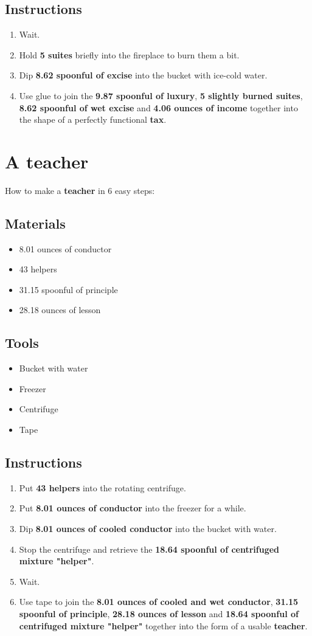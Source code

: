 \documentclass{article}
\begin{document}
\subsection{Instructions}\begin{enumerate}
\item 
Wait.
\item 
Hold \textbf{5 suites} briefly into the fireplace to burn them a bit.
\item 
Dip \textbf{8.62 spoonful of excise} into the bucket with ice-cold water.
\item 
Use glue to join the \textbf{9.87 spoonful of luxury}, \textbf{5 slightly burned suites}, \textbf{8.62 spoonful of wet excise} and \textbf{4.06 ounces of income} together into the shape of a perfectly functional \textbf{tax}.
\end{enumerate}
\newpage
\section{A teacher}How to make a \textbf{teacher} in 6 easy steps:

\subsection{Materials}\begin{itemize}
\item 
8.01 ounces of conductor
\item 
43 helpers
\item 
31.15 spoonful of principle
\item 
28.18 ounces of lesson
\end{itemize}
\subsection{Tools}\begin{itemize}
\item 
Bucket with water
\item 
Freezer
\item 
Centrifuge
\item 
Tape
\end{itemize}
\subsection{Instructions}\begin{enumerate}
\item 
Put \textbf{43 helpers} into the rotating centrifuge.
\item 
Put \textbf{8.01 ounces of conductor} into the freezer for a while.
\item 
Dip \textbf{8.01 ounces of cooled conductor} into the bucket with water.
\item 
Stop the centrifuge and retrieve the \textbf{18.64 spoonful of centrifuged mixture "helper"}.
\item 
Wait.
\item 
Use tape to join the \textbf{8.01 ounces of cooled and wet conductor}, \textbf{31.15 spoonful of principle}, \textbf{28.18 ounces of lesson} and \textbf{18.64 spoonful of centrifuged mixture "helper"} together into the form of a usable \textbf{teacher}.
\end{enumerate}
\newpage
\end{document}
